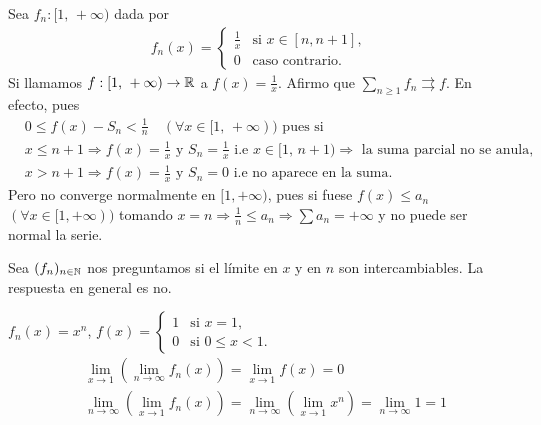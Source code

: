 \begin{eg}
  Sea \(f_n : [1\text{, }+\infty)\) dada por \begin{align*}
    f_n(x) = \begin{cases}
               \frac{1}{x} & \text{si } x \in [n, n+1], \\
               0           & \text{caso contrario.}
             \end{cases}
  \end{align*}
  Si llamamos \(f: [1\text{, } +\infty) \to \mathbb{R} \) a \(f(x) = \frac{1}{x} \).
  Afirmo que \(\sum_{n \geq 1} f_n \rightrightarrows f\). En efecto, pues
  \begin{align*}
     & 0 \leq f(x) - S_n < \frac{1}{n} \quad (\forall x \in [1\text{, } +\infty)) \text{ pues si }                                                                  \\
     & x \leq n+1 \Rightarrow f(x) = \frac{1}{x} \text{ y } S_n = \frac{1}{x} \text{ i.e } x \in [1\text{, } n+1) \Rightarrow \text{ la suma parcial no se anula, } \\
     & x > n+1 \Rightarrow f(x) = \frac{1}{x} \text{ y } S_n = 0 \text{ i.e no aparece en la suma.}
  \end{align*}
  Pero no converge normalmente en \([1, +\infty)\), pues si fuese \(f(x) \leq a_n\) \((\forall x \in [1, +\infty))\) tomando \(x = n \Rightarrow \frac{1}{n} \leq a_n \Rightarrow \sum a_n = +\infty\) y no puede ser normal la serie.
\end{eg}

\begin{note}
  Sea \((f_n)_{n \in \mathbb{N}} \) nos preguntamos si el límite en \(x\) y en \(n\) son intercambiables. La respuesta en general es no.
\end{note}

\begin{eg}
  \(f_n(x) = x^n\), \(f(x) = \begin{cases}
      1 & \text{si } x = 1,        \\
      0 & \text{si } 0 \leq x < 1.
    \end{cases} \) \begin{align*}
    & \lim_{x \to 1} \left(\lim_{n \to \infty} f_n(x)\right) = \lim_{x \to 1} f(x) = 0 \\
    & \lim_{n \to \infty} \left(\lim_{x \to 1} f_n(x)\right) = \lim_{n \to \infty} \left(\lim_{x \to 1} x^n\right) = \lim_{n \to \infty} 1 = 1
  \end{align*}
\end{eg}

